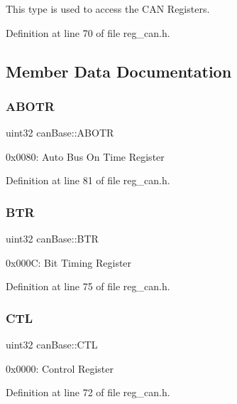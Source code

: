 This type is used to access the C\+AN Registers. 

Definition at line 70 of file reg\+\_\+can.\+h.



\subsection{Member Data Documentation}
\mbox{\label{structcanBase_a76721a8260c3b52f2888f9f63a468130}} 
\subsubsection{\texorpdfstring{A\+B\+O\+TR}{ABOTR}}
{\footnotesize\ttfamily uint32 can\+Base\+::\+A\+B\+O\+TR}

0x0080\+: Auto Bus On Time Register 

Definition at line 81 of file reg\+\_\+can.\+h.

\mbox{\label{structcanBase_adf351132631875785af2cb7cea4168d4}} 
\subsubsection{\texorpdfstring{B\+TR}{BTR}}
{\footnotesize\ttfamily uint32 can\+Base\+::\+B\+TR}

0x000C\+: Bit Timing Register 

Definition at line 75 of file reg\+\_\+can.\+h.

\mbox{\label{structcanBase_aeb30029ea44e5a13ac1a922a37bb65e1}} 
\subsubsection{\texorpdfstring{C\+TL}{CTL}}
{\footnotesize\ttfamily uint32 can\+Base\+::\+C\+TL}

0x0000\+: Control Register 

Definition at line 72 of file reg\+\_\+can.\+h.

\mbox{\label{structcanBase_a55d7705d4d0ce64b48b8cc83fcb3b65e}} 
